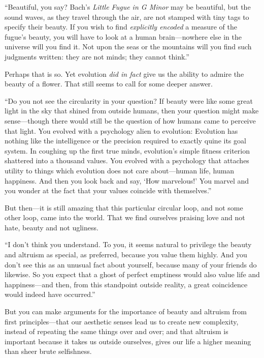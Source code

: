 {
 ``Beautiful, you say? Bach's
\textit{Little Fugue in G Minor} may be beautiful, but the sound waves,
as they travel through the air, are not stamped with tiny tags to
specify their beauty. If you wish to find \textit{explicitly encoded} a
measure of the fugue's beauty, you will have to look at
a human brain---nowhere else in the universe will you find it. Not upon
the seas or the mountains will you find such judgments written: they
are not minds; they cannot think.''}

{
 Perhaps that is so. Yet evolution \textit{did in fact} give us the
ability to admire the beauty of a flower. That still seems to call for
some deeper answer.}

{
 ``Do you not see the circularity in your
question? If beauty were like some great light in the sky that shined
from outside humans, then your question might make sense---though there
would still be the question of how humans came to perceive that light.
You evolved with a psychology alien to evolution: Evolution has nothing
like the intelligence or the precision required to exactly quine its
goal system. In coughing up the first true minds,
evolution's simple fitness criterion shattered into a
thousand values. You evolved with a psychology that attaches utility to
things which evolution does not care about---human life, human
happiness. And then you look back and say, `How
marvelous!' You marvel and you wonder at the fact that
your values coincide with themselves.''}

{
 But then---it is still amazing that this particular circular loop,
and not some other loop, came into the world. That we find ourselves
praising love and not hate, beauty and not ugliness.}

{
 ``I don't think you understand.
To you, it seems natural to privilege the beauty and altruism as
special, as preferred, because you value them highly. And you
don't see this as an unusual fact about yourself,
because many of your friends do likewise. So you expect that a ghost of
perfect emptiness would also value life and happiness---and then, from
this standpoint outside reality, a great coincidence would indeed have
occurred.''}

{
 But you can make arguments for the importance of beauty and
altruism from first principles---that our aesthetic senses lead us to
create new complexity, instead of repeating the same things over and
over; and that altruism is important because it takes us outside
ourselves, gives our life a higher meaning than sheer brute
selfishness.}

